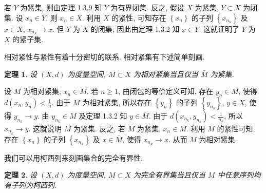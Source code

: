 \documentclass[openany]{ctexbook}
\makeatletter
\theoremstyle{kaiti}
\newtheorem{theorem}{定理}[section]
\theoremstyle{normal}
\renewenvironment{proof}[1][\proofname]{\par
    \pushQED{\qed}%
    \normalfont \topsep6\p@\@plus6\p@\relax
    \trivlist
    \item\relax
    {\heiti #1}\hspace{2\labelsep}\ignorespaces
  }{%
    \popQED\endtrivlist\@endpefalse
  }
\makeatother
\begin{document}
\begin{proof}
若 $Y$ 为紧集, 则由定理 1.3.9 知 $Y$ 为有界闭集. 反之, 假设 $X$ 为紧集, $Y \subset X$ 为闭集. 设 $x_n \in Y$, 则 $x_n \in X$. 利用 $X$ 的紧性, 可知存在 $\left\{x_n\right\}$ 的子列 $\left\{x_{n_{k}}\right\}$ 及 $x \in X$, $x_{n_{k}} \rightarrow x$. 但 $Y$ 为 $X$ 的闭集, 因此由定理 1.3.2 知 $x \in Y$. 这就证明了 $Y$ 为 $X$ 的紧子集.
\end{proof}

相对紧性与紧性有着十分密切的联系. 相对紧集有下述简单刻画.

\begin{theorem}
  设 $(X, d)$ 为度量空间, $M \subset X$ 为相对紧集当且仅当 $\bar{M}$ 为紧集.
\end{theorem}

\begin{proof}
设 $M$ 为相对紧集, $x_n \in \bar{M}$. 若 $n \geqslant 1$, 由闭包的等价定义可知, 存在 $y_n \in M$, 使得 $d\left(x_n, y_n\right)<\frac{1}{n}$. 由于 $M$ 为相对紧集, 所以存在 $\left\{y_n\right\}$ 的子列 $\left\{y_{n_{k}}\right\}$, $y \in X$, 使得 $y_{n_{k}} \rightarrow y$. 由 $y_{n_{k}} \in M$ 及定理 1.3.2 知 $y \in \bar{M}$. 由于 $d\left(x_{n_{k}}, y_{n_{k}}\right)<\frac{1}{n_{k}}$, 所以 $x_{n_{k}} \rightarrow y$. 这就说明 $\bar{M}$ 为紧集. 反之, 若 $\bar{M}$ 为紧集, $x_n \in M$. 利用 $\bar{M}$ 的紧性可知, 存在 $\left\{x_n\right\}$ 的子列 $\left\{x_{n_{k}}\right\}$ 及 $x \in \bar{M}$, 使得 $x_{n_{k}} \rightarrow x$. 从而 $M$ 为相对紧集.
\end{proof}

我们可以用柯西列来刻画集合的完全有界性.

\begin{theorem}
  设 $(X, d)$ 为度量空间, $M \subset X$ 为完全有界集当且仅当 $M$ 中任意序列均有子列为柯西列.
\end{theorem}
\end{document}
